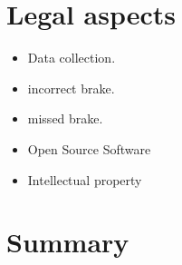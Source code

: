 \documentclass[conference]{IEEEtran}
\begin{document}
\section{Legal aspects}
\begin{itemize}
	\item Data collection.
	\item incorrect brake.
	\item missed brake.
	\item Open Source Software
	\item Intellectual property
\end{itemize}

\section{Summary}
\end{document}
